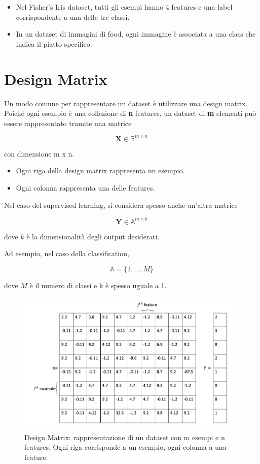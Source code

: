 \begin{itemize}
    \item Nel Fisher’s Iris dataset, tutti gli esempi hanno 4 features e una label corrispondente a una delle tre classi.
    \item In un dataset di immagini di food, ogni immagine è associata a una class che indica il piatto specifico.
\end{itemize}

\section{Design Matrix}

Un modo comune per rappresentare un dataset è utilizzare una design matrix. Poiché ogni esempio è una collezione di \textbf{n} features, un dataset di \textbf{m} elementi può essere rappresentato tramite una matrice

$$ \mathbf{X} \in \mathbb{R}^{m \times n} $$

\noindent
con dimensione m x n.

\begin{itemize}
    \item Ogni riga della design matrix rappresenta un esempio.
    \item Ogni colonna rappresenta una delle features.
\end{itemize}

\noindent
Nel caso del supervised learning, si considera spesso anche un'altra matrice

$$ \mathbf{Y} \in \mathbb{A}^{m \times k} $$

\noindent
dove \( k \) è la dimensionalità degli output desiderati.

\noindent
Ad esempio, nel caso della classification,

\[ \mathbb{A} = \{1, \ldots, M\} \]

\noindent
dove \( M \) è il numero di classi e k è spesso uguale a 1.

\begin{figure}[htbp]
    \centering
    \includegraphics[width=\textwidth]{images/designMatrix.jpg}
    \caption{Design Matrix: rappresentazione di un dataset con m esempi e n features. Ogni riga corrisponde a un esempio, ogni colonna a una feature.}
    \label{fig:designMatrix}
\end{figure}

